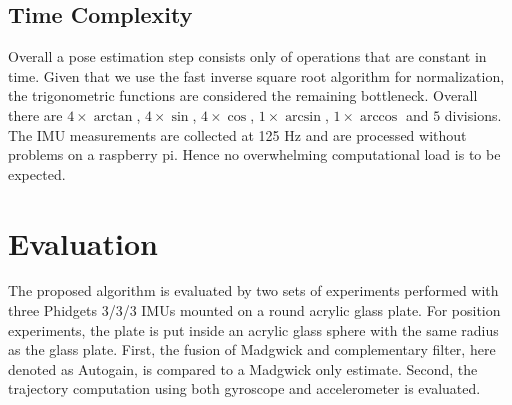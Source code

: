 \documentclass[letterpaper, 10 pt, conference]{ieeeconf}  %
\begin{document}
\subsection{Time Complexity}

Overall a pose estimation step consists only of operations that are constant in time. 
Given that we use the fast inverse square root algorithm \cite{FastInvSqrt} for normalization, the trigonometric functions are considered the remaining bottleneck.
Overall there are $4\times\arctan$, $4\times\sin$, $4\times\cos$, $1\times\arcsin$, $1\times\arccos$ and $5$ divisions. 
The IMU measurements are collected at 125 Hz and are processed without problems on a raspberry pi.
Hence no overwhelming computational load is to be expected.

 
 

\section{Evaluation}
The proposed algorithm is evaluated by two sets of experiments performed with three Phidgets 3/3/3 IMUs mounted on a round acrylic glass plate.
For position experiments, the plate is put inside an acrylic glass sphere with the same radius as the glass plate.
First, the fusion of Madgwick and complementary filter, here denoted as Autogain, is compared to a Madgwick only estimate. Second, the trajectory computation using both gyroscope and accelerometer is evaluated.
\end{document}
